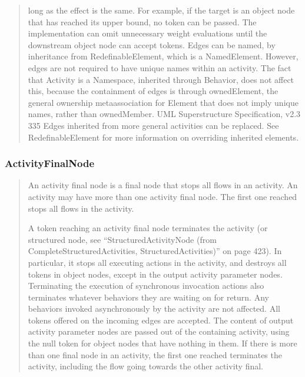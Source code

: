 \begin{quotation}
long as the effect is the same. For example, if the target is an object node that has reached its upper bound, no token can
be passed. The implementation can omit unnecessary weight evaluations until the downstream object node can accept
tokens.
Edges can be named, by inheritance from RedefinableElement, which is a NamedElement. However, edges are not
required to have unique names within an activity. The fact that Activity is a Namespace, inherited through Behavior, does
not affect this, because the containment of edges is through ownedElement, the general ownership metaassociation for
Element that does not imply unique names, rather than ownedMember.
UML Superstructure Specification, v2.3
335
Edges inherited from more general activities can be replaced. See RedefinableElement for more information on overriding
inherited elements.

\end{quotation}
\subsubsection{ActivityFinalNode}
\begin{quotation}
An activity final node is a final node that stops all flows in an activity.
An activity may have more than one activity final node. The first one reached stops all flows in the activity.

A token reaching an activity final node terminates the activity (or structured node, see “StructuredActivityNode (from
CompleteStructuredActivities, StructuredActivities)” on page 423). In particular, it stops all executing actions in the
activity, and destroys all tokens in object nodes, except in the output activity parameter nodes. Terminating the execution
of synchronous invocation actions also terminates whatever behaviors they are waiting on for return. Any behaviors
invoked asynchronously by the activity are not affected. All tokens offered on the incoming edges are accepted. The
content of output activity parameter nodes are passed out of the containing activity, using the null token for object nodes
that have nothing in them. If there is more than one final node in an activity, the first one reached terminates the activity,
including the flow going towards the other activity final.

\end{quotation}
